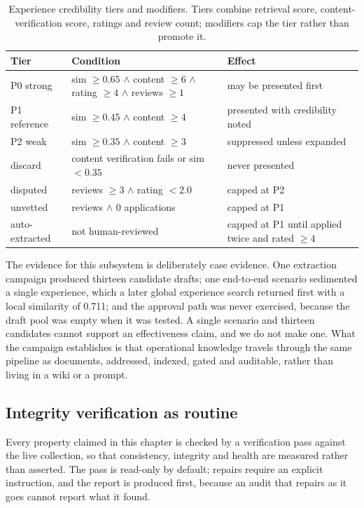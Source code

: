 \begin{table}[t]
\centering
\small
\caption{Experience credibility tiers and modifiers. Tiers combine retrieval
score, content-verification score, ratings and review count; modifiers cap
the tier rather than promote it.}
\label{tab:exp-tiers}
\begin{tabular}{@{}l>{\raggedright\arraybackslash}p{3.6cm}p{}@{}}
\toprule
Tier & Condition & Effect \\
\midrule
P0 strong & sim $\ge 0.65$ $\wedge$ content $\ge 6$ $\wedge$ rating $\ge 4$ $\wedge$ reviews $\ge 1$ & may be presented first \\
P1 reference & sim $\ge 0.45$ $\wedge$ content $\ge 4$ & presented with credibility noted \\
P2 weak & sim $\ge 0.35$ $\wedge$ content $\ge 3$ & suppressed unless expanded \\
discard & content verification fails or sim $< 0.35$ & never presented \\
\addlinespace
disputed & reviews $\ge 3$ $\wedge$ rating $< 2.0$ & capped at P2 \\
unvetted & 0 reviews $\wedge$ 0 applications & capped at P1 \\
auto-extracted & not human-reviewed & capped at P1 until applied twice and rated $\ge 4$ \\
\bottomrule
\end{tabular}
\end{table}

The evidence for this subsystem is deliberately case evidence. One extraction
campaign produced thirteen candidate drafts; one end-to-end scenario
sedimented a single experience, which a later global experience search
returned first with a local similarity of 0.711; and the approval path was
never exercised, because the draft pool was empty when it was tested. A
single scenario and thirteen candidates cannot support an effectiveness
claim, and we do not make one. What the campaign establishes is that
operational knowledge travels through the same pipeline as documents,
addressed, indexed, gated and auditable, rather than living in a wiki or a
prompt.

\subsection{Integrity verification as routine}
\label{sec:org-integrity}

Every property claimed in this chapter is checked by a verification pass
against the live collection, so that consistency, integrity and health are
measured rather than asserted. The pass is read-only by default; repairs
require an explicit instruction, and the report is produced first, because an
audit that repairs as it goes cannot report what it found.

